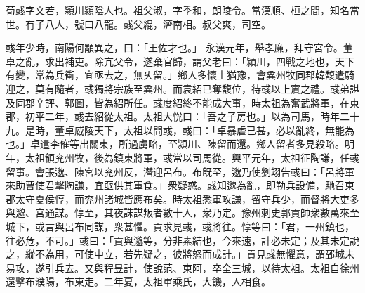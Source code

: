 \begin{pinyinscope}
 
 
 荀彧字文若，潁川潁陰人也。祖父淑，字季和，朗陵令。當漢順、桓之間，知名當世。有子八人，號曰八龍。彧父緄，濟南相。叔父爽，司空。
 
 
 
 
彧年少時，南陽何顒異之，曰：「王佐才也。」
 永漢元年，舉孝廉，拜守宮令。董卓之亂，求出補吏。除亢父令，遂棄官歸，謂父老曰：「潁川，四戰之地也，天下有變，常為兵衝，宜亟去之，無乆留。」鄉人多懷土猶豫，會兾州牧同郡韓馥遣騎迎之，莫有隨者，彧獨將宗族至兾州。而袁紹已奪馥位，待彧以上賔之禮。彧弟諶及同郡辛評、郭圖，皆為紹所任。彧度紹終不能成大事，時太祖為奮武將軍，在東郡，初平二年，彧去紹從太祖。太祖大恱曰：「吾之子房也。」以為司馬，時年二十九。是時，董卓威陵天下，太祖以問彧，彧曰：「卓暴虐已甚，必以亂終，無能為也。」卓遣李傕等出關東，所過虜略，至潁川、陳留而還。鄉人留者多見殺略。明年，太祖領兖州牧，後為鎮東將軍，彧常以司馬從。興平元年，太祖征陶謙，任彧留事。會張邈、陳宮以兖州反，潛迎呂布。布旣至，邈乃使劉翊告彧曰：「呂將軍來助曹使君擊陶謙，宜亟供其軍食。」衆疑惑。彧知邈為亂，即勒兵設備，馳召東郡太守夏侯惇，而兖州諸城皆應布矣。時太祖悉軍攻謙，留守兵少，而督將大吏多與邈、宮通謀。惇至，其夜誅謀叛者數十人，衆乃定。豫州刺史郭貢帥衆數萬來至城下，或言與呂布同謀，衆甚懼。貢求見彧，彧將往。惇等曰：「君，一州鎮也，往必危，不可。」彧曰：「貢與邈等，分非素結也，今來速，計必未定；及其未定說之，縱不為用，可使中立，若先疑之，彼將怒而成計。」貢見彧無懼意，謂鄄城未易攻，遂引兵去。又與程昱計，使說范、東阿，卒全三城，以待太祖。太祖自徐州還擊布濮陽，布東走。二年夏，太祖軍乘氏，大饑，人相食。
 

\end{pinyinscope}
